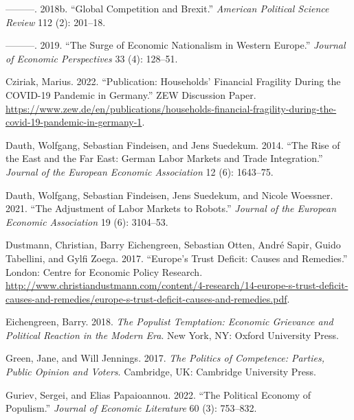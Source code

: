 \documentclass[
]{article}
\newlength{\cslhangindent}
\newlength{\cslentryspacingunit} %
\newenvironment{CSLReferences}[2] %
 {%
  \setlength{\parindent}{0pt}
  \ifodd #1
  \let\oldpar\par
  \def\par{\hangindent=\cslhangindent\oldpar}
  \fi
  \setlength{\parskip}{#2\cslentryspacingunit}
 }%
 {}
\begin{document}
\begin{CSLReferences}{1}{0}
\leavevmode{}%
---------. 2018b. {``Global {Competition} and {Brexit}.''}
\emph{American Political Science Review} 112 (2): 201--18.

\leavevmode{}%
---------. 2019. {``The {Surge} of {Economic} {Nationalism} in {Western}
{Europe}.''} \emph{Journal of Economic Perspectives} 33 (4): 128--51.

\leavevmode{}%
Cziriak, Marius. 2022. {``Publication: {Households}' {Financial}
{Fragility} {During} the {COVID}-19 {Pandemic} in {Germany}.''} {ZEW}
{Discussion} {Paper}.
\url{https://www.zew.de/en/publications/households-financial-fragility-during-the-covid-19-pandemic-in-germany-1}.

\leavevmode{}%
Dauth, Wolfgang, Sebastian Findeisen, and Jens Suedekum. 2014. {``The
{Rise} of the {East} and the {Far} {East}: {German} {Labor} {Markets}
and {Trade} {Integration}.''} \emph{Journal of the European Economic
Association} 12 (6): 1643--75.

\leavevmode{}%
Dauth, Wolfgang, Sebastian Findeisen, Jens Suedekum, and Nicole
Woessner. 2021. {``The {Adjustment} of {Labor} {Markets} to {Robots}.''}
\emph{Journal of the European Economic Association} 19 (6): 3104--53.

\leavevmode{}%
Dustmann, Christian, Barry Eichengreen, Sebastian Otten, André Sapir,
Guido Tabellini, and Gylfi Zoega. 2017. {``Europe's {Trust} {Deficit}:
{Causes} and {Remedies}.''} London: Centre for Economic Policy Research.
\url{http://www.christiandustmann.com/content/4-research/14-europe-s-trust-deficit-causes-and-remedies/europe-s-trust-deficit-causes-and-remedies.pdf}.

\leavevmode{}%
Eichengreen, Barry. 2018. \emph{The {Populist} {Temptation}: {Economic}
{Grievance} and {Political} {Reaction} in the {Modern} {Era}}. New York,
NY: Oxford University Press.

\leavevmode{}%
Green, Jane, and Will Jennings. 2017. \emph{The {Politics} of
{Competence}: {Parties}, {Public} {Opinion} and {Voters}}. Cambridge,
UK: Cambridge University Press.

\leavevmode{}%
Guriev, Sergei, and Elias Papaioannou. 2022. {``The {Political}
{Economy} of {Populism}.''} \emph{Journal of Economic Literature} 60
(3): 753--832.


\end{CSLReferences}
\end{document}

